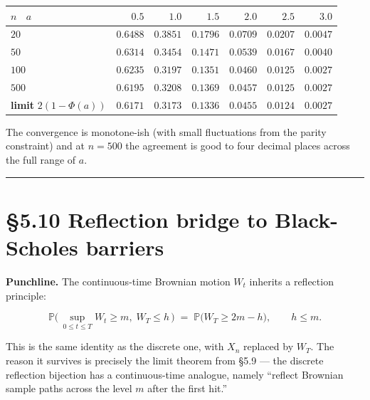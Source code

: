 \documentclass[
  10pt,
  twoside]{book}
\newcounter{none} %
\begin{document}
{\def\LTcaptype{none} %
\begin{table}[H]
\centering
\begin{tabular}{|l|r|r|r|r|r|r|}
\toprule
\(n\) ~\(a\) & \(0.5\) & \(1.0\) & \(1.5\) & \(2.0\) & \(2.5\) & \(3.0\) \\
\midrule



\(20\) & \(0.6488\) & \(0.3851\) & \(0.1796\) & \(0.0709\) & \(0.0207\)
& \(0.0047\) \\
\(50\) & \(0.6314\) & \(0.3454\) & \(0.1471\) & \(0.0539\) & \(0.0167\)
& \(0.0040\) \\
\(100\) & \(0.6235\) & \(0.3197\) & \(0.1351\) & \(0.0460\) & \(0.0125\)
& \(0.0027\) \\
\(500\) & \(0.6195\) & \(0.3208\) & \(0.1369\) & \(0.0457\) & \(0.0125\)
& \(0.0027\) \\
\textbf{limit} \(2(1-\Phi(a))\) & \(\mathbf{0.6171}\) &
\(\mathbf{0.3173}\) & \(\mathbf{0.1336}\) & \(\mathbf{0.0455}\) &
\(\mathbf{0.0124}\) & \(\mathbf{0.0027}\) \\
\bottomrule
\end{tabular}
\end{table}
}

The convergence is monotone-ish (with small fluctuations from the parity
constraint) and at \(n = 500\) the agreement is good to four decimal
places across the full range of \(a\).

\begin{center}\rule{0.5\linewidth}{0.5pt}\end{center}

\section{§5.10 Reflection bridge to Black-Scholes
barriers}\label{reflection-bridge-to-black-scholes-barriers}

\textbf{Punchline.} The continuous-time Brownian motion \(W_t\) inherits
a reflection principle:

\[\mathbb P\bigl(\,\sup_{0 \le t \le T} W_t \ge m,\; W_T \le h\,\bigr) \;=\; \mathbb P\bigl(W_T \ge 2m - h\bigr), \qquad h \le m.\]

This is the same identity as the discrete one, with \(X_n\) replaced by
\(W_T\). The reason it survives is precisely the limit theorem from §5.9
--- the discrete reflection bijection has a continuous-time analogue,
namely ``reflect Brownian sample paths across the level \(m\) after the
first hit.''
\end{document}
